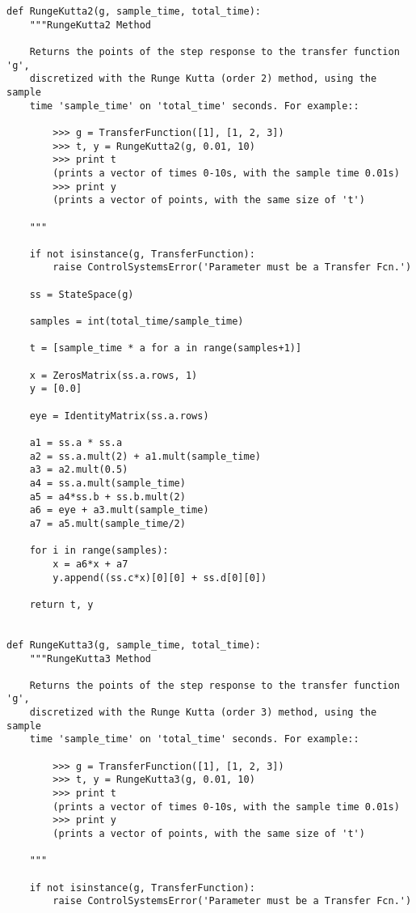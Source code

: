 \begin{verbatim}
def RungeKutta2(g, sample_time, total_time):
    """RungeKutta2 Method
    
    Returns the points of the step response to the transfer function 'g',
    discretized with the Runge Kutta (order 2) method, using the sample
    time 'sample_time' on 'total_time' seconds. For example::
    
        >>> g = TransferFunction([1], [1, 2, 3])
        >>> t, y = RungeKutta2(g, 0.01, 10)
        >>> print t
        (prints a vector of times 0-10s, with the sample time 0.01s)
        >>> print y
        (prints a vector of points, with the same size of 't')
    
    """
    
    if not isinstance(g, TransferFunction):
        raise ControlSystemsError('Parameter must be a Transfer Fcn.')

    ss = StateSpace(g)
    
    samples = int(total_time/sample_time)
    
    t = [sample_time * a for a in range(samples+1)]
    
    x = ZerosMatrix(ss.a.rows, 1)
    y = [0.0]
    
    eye = IdentityMatrix(ss.a.rows)
    
    a1 = ss.a * ss.a
    a2 = ss.a.mult(2) + a1.mult(sample_time)
    a3 = a2.mult(0.5)
    a4 = ss.a.mult(sample_time)
    a5 = a4*ss.b + ss.b.mult(2)
    a6 = eye + a3.mult(sample_time)
    a7 = a5.mult(sample_time/2)
    
    for i in range(samples):
        x = a6*x + a7
        y.append((ss.c*x)[0][0] + ss.d[0][0])

    return t, y


def RungeKutta3(g, sample_time, total_time):
    """RungeKutta3 Method
    
    Returns the points of the step response to the transfer function 'g',
    discretized with the Runge Kutta (order 3) method, using the sample
    time 'sample_time' on 'total_time' seconds. For example::
    
        >>> g = TransferFunction([1], [1, 2, 3])
        >>> t, y = RungeKutta3(g, 0.01, 10)
        >>> print t
        (prints a vector of times 0-10s, with the sample time 0.01s)
        >>> print y
        (prints a vector of points, with the same size of 't')
    
    """
    
    if not isinstance(g, TransferFunction):
        raise ControlSystemsError('Parameter must be a Transfer Fcn.')


\end{verbatim}
